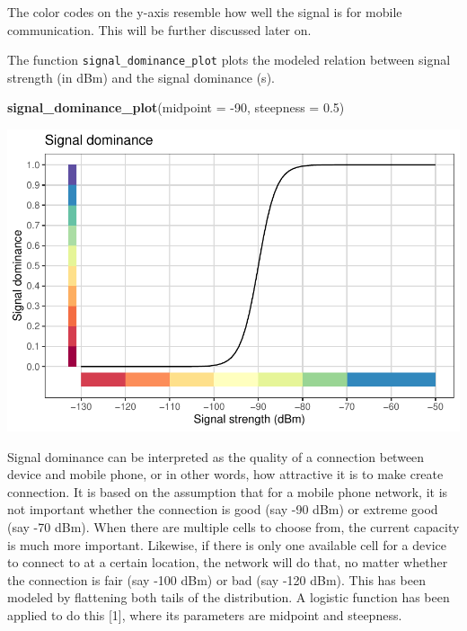 \documentclass[
]{article}
\newenvironment{Shaded}{\begin{snugshade}}{\end{snugshade}}
\newcommand{\DataTypeTok}[1]{\textcolor[rgb]{0.13,0.29,0.53}{#1}}
\newcommand{\DecValTok}[1]{\textcolor[rgb]{0.00,0.00,0.81}{#1}}
\newcommand{\FloatTok}[1]{\textcolor[rgb]{0.00,0.00,0.81}{#1}}
\newcommand{\KeywordTok}[1]{\textcolor[rgb]{0.13,0.29,0.53}{\textbf{#1}}}
\newcommand{\NormalTok}[1]{#1}
\begin{document}
The color codes on the y-axis resemble how well the signal is for mobile
communication. This will be further discussed later on.

The function \texttt{signal\_dominance\_plot} plots the modeled relation
between signal strength (in dBm) and the signal dominance (s).

\begin{Shaded}
\begin{Highlighting}[]
\KeywordTok{signal_dominance_plot}\NormalTok{(}\DataTypeTok{midpoint =} \DecValTok{-90}\NormalTok{, }\DataTypeTok{steepness =} \FloatTok{0.5}\NormalTok{)}
\end{Highlighting}
\end{Shaded}

\includegraphics{mobvis-mobloc_files/figure-latex/unnamed-chunk-6-1.pdf}

Signal dominance can be interpreted as the quality of a connection
between device and mobile phone, or in other words, how attractive it is
to make create connection. It is based on the assumption that for a
mobile phone network, it is not important whether the connection is good
(say -90 dBm) or extreme good (say -70 dBm). When there are multiple
cells to choose from, the current capacity is much more important.
Likewise, if there is only one available cell for a device to connect to
at a certain location, the network will do that, no matter whether the
connection is fair (say -100 dBm) or bad (say -120 dBm). This has been
modeled by flattening both tails of the distribution. A logistic
function has been applied to do this {[}1{]}, where its parameters are
midpoint and steepness.
\end{document}
